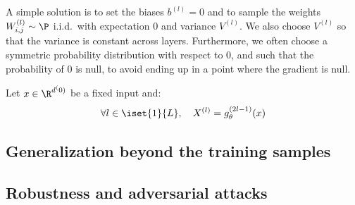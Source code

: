 A simple solution is to set the biases $b^{(l)}=0$ and to sample the weights $W_{i,j}^{(l)}\sim\P$ i.i.d.~with expectation $0$ and variance $V^{(l)}$. We also choose $V^{(l)}$ so that the variance is constant across layers. Furthermore, we often choose a symmetric probability distribution with respect to 0, and such that the probability of 0 is null, to avoid ending up in a point where the gradient is null.

\begin{lemma}
    Let $x\in\R^{d^(0)}$ be a fixed input and:
    \begin{equation*}
        \forall l\in\iset{1}{L}, \quad X^{(l)}=g_\theta^{(2l-1)}(x)
    \end{equation*}
\end{lemma}

\subsection{Generalization beyond the training samples}

\subsection{Robustness and adversarial attacks}

\newpage